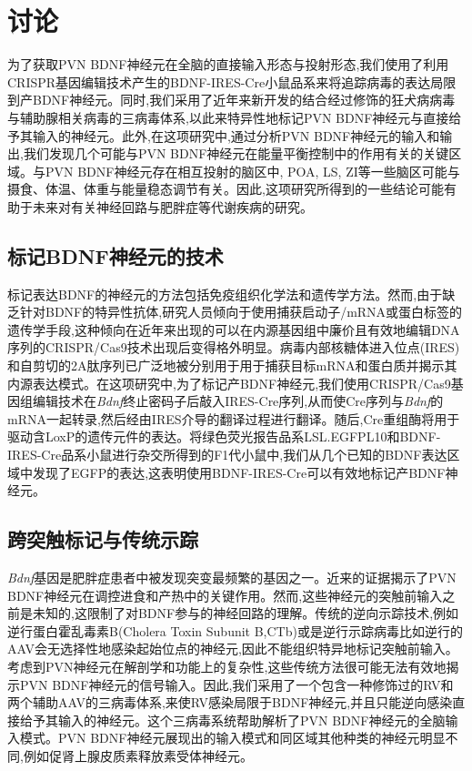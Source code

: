 \chapter{讨论}\label{chap:discussion}
为了获取PVN BDNF神经元在全脑的直接输入形态与投射形态,我们使用了利用CRISPR基因编辑技术产生的BDNF-IRES-Cre小鼠品系来将追踪病毒的表达局限到产BDNF神经元。同时,我们采用了近年来新开发的结合经过修饰的狂犬病病毒与辅助腺相关病毒的三病毒体系,以此来特异性地标记PVN BDNF神经元与直接给予其输入的神经元。此外,在这项研究中,通过分析PVN BDNF神经元的输入和输出,我们发现几个可能与PVN BDNF神经元在能量平衡控制中的作用有关的关键区域。与PVN BDNF神经元存在相互投射的脑区中, POA, LS, ZI等一些脑区可能与摄食、体温、体重与能量稳态调节有关。因此,这项研究所得到的一些结论可能有助于未来对有关神经回路与肥胖症等代谢疾病的研究。

\section{标记BDNF神经元的技术}
标记表达BDNF的神经元的方法包括免疫组织化学法和遗传学方法。然而,由于缺乏针对BDNF的特异性抗体,研究人员倾向于使用捕获启动子/mRNA或蛋白标签的遗传学手段,这种倾向在近年来出现的可以在内源基因组中廉价且有效地编辑DNA序列的CRISPR/Cas9技术\citep{ran2013genome,doudna2014new}出现后变得格外明显。病毒内部核糖体进入位点(IRES)和自剪切的2A肽序列已广泛地被分别用于用于捕获目标mRNA和蛋白质并揭示其内源表达模式\citep{vong2011leptin,daigle2018suite}。在这项研究中,为了标记产BDNF神经元,我们使用CRISPR/Cas9基因组编辑技术在\textit{Bdnf}终止密码子后敲入IRES-Cre序列,从而使Cre序列与\textit{Bdnf}的mRNA一起转录,然后经由IRES介导的翻译过程进行翻译。随后,Cre重组酶将用于驱动含LoxP的遗传元件的表达。将绿色荧光报告品系LSL.EGFPL10和BDNF-IRES-Cre品系小鼠进行杂交所得到的F1代小鼠中,我们从几个已知的BDNF表达区域中发现了EGFP的表达,这表明使用BDNF-IRES-Cre可以有效地标记产BDNF神经元。

\section{跨突触标记与传统示踪}
\textit{Bdnf}基因是肥胖症患者中被发现突变最频繁的基因之一。近来的证据揭示了PVN BDNF神经元在调控进食和产热中的关键作用。然而,这些神经元的突触前输入之前是未知的,这限制了对BDNF参与的神经回路的理解。传统的逆向示踪技术,例如逆行蛋白霍乱毒素B(Cholera Toxin Subunit B,CTb)\citep{conte2009multiple}或是逆行示踪病毒比如逆行的AAV\citep{tervo2016designer}会无选择性地感染起始位点的神经元,因此不能组织特异地标记突触前输入。考虑到PVN神经元在解剖学和功能上的复杂性,这些传统方法很可能无法有效地揭示PVN BDNF神经元的信号输入。因此,我们采用了一个包含一种修饰过的RV和两个辅助AAV的三病毒体系,来使RV感染局限于BDNF神经元,并且只能逆向感染直接给予其输入的神经元。这个三病毒系统帮助解析了PVN BDNF神经元的全脑输入模式。PVN BDNF神经元展现出的输入模式和同区域其他种类的神经元明显不同,例如促肾上腺皮质素释放素受体神经元\citep{jiang2018local}。

